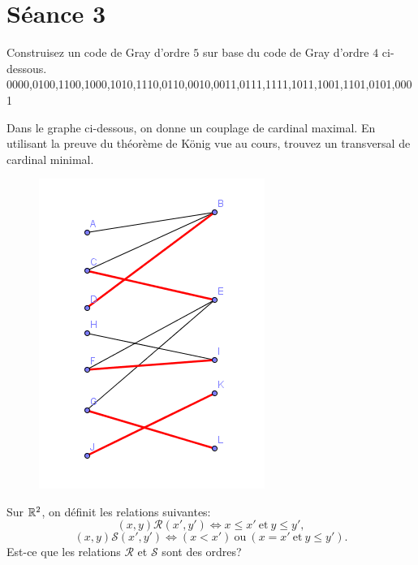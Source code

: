 
\section{Séance 3}

\vspace*{1cm}

\begin{exo}
Construisez un code de Gray d'ordre $5$ sur base du code de Gray d'ordre $4$ ci-dessous.\\
0000,0100,1100,1000,1010,1110,0110,0010,0011,0111,1111,1011,1001,1101,0101,0001
\end{exo}

\vspace*{1cm}

\begin{exo}
Dans le graphe ci-dessous, on donne un couplage de cardinal maximal. En utilisant la preuve du th\'eor\`eme de K\"onig vue au cours, trouvez un transversal de cardinal minimal.
\end{exo}

\begin{figure}[!h]
\begin{center}
\includegraphics{../Figures/Transversal.png} 
\end{center}
\end{figure}

\begin{exo}
Sur $\mathbb{R}^2$, on d\'efinit les relations suivantes:
$$(x,y)\mathcal{R}(x',y') \Leftrightarrow x \leq x' \mathrm{~et~} y \leq y', $$
$$(x,y)\mathcal{S}(x',y') \Leftrightarrow (x < x') \mathrm{~ou~} (x = x' \mathrm{~et~} y \leq y').$$
Est-ce que les relations $\mathcal{R}$ et $\mathcal{S}$ sont des ordres?
\end{exo}

